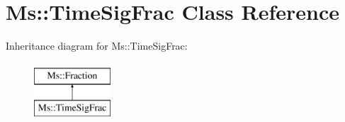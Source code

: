 \hypertarget{class_ms_1_1_time_sig_frac}{}\section{Ms\+:\+:Time\+Sig\+Frac Class Reference}
\label{class_ms_1_1_time_sig_frac}
Inheritance diagram for Ms\+:\+:Time\+Sig\+Frac\+:\begin{figure}[H]
\begin{center}
\leavevmode
\includegraphics[height=2.000000cm]{class_ms_1_1_time_sig_frac}
\end{center}
\end{figure}
